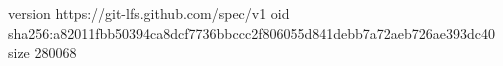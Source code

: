 version https://git-lfs.github.com/spec/v1
oid sha256:a82011fbb50394ca8dcf7736bbccc2f806055d841debb7a72aeb726ae393dc40
size 280068
